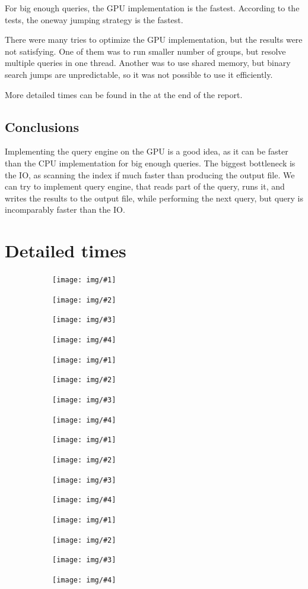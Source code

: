 \documentclass[a4paper,12pt]{article}
\newcommand{\plottimes}[4]{
    \begin{figure}
        \begin{subfigure}{.5\textwidth}
            \centering
            \texttt{[image: img/\#1]}
        \end{subfigure}%
        \begin{subfigure}{.5\textwidth}
            \centering
            \texttt{[image: img/\#2]}
        \end{subfigure}
        \begin{subfigure}{.5\textwidth}
            \centering
            \texttt{[image: img/\#3]}
        \end{subfigure}%
        \begin{subfigure}{.5\textwidth}
            \centering
            \texttt{[image: img/\#4]}
        \end{subfigure}
    \end{figure}
}
\begin{document}
    For big enough queries, the GPU implementation is the fastest.
    According to the tests, the oneway jumping strategy is the fastest.

    There were many tries to optimize the GPU implementation, but the results were not satisfying.
    One of them was to run smaller number of groups, but resolve multiple queries in one thread.
    Another was to use shared memory, but binary search jumps are unpredictable, so it was not possible to use it efficiently.

    More detailed times can be found in the at the end of the report.

    \subsection{Conclusions}

    Implementing the query engine on the GPU is a good idea, as it can be faster than the CPU implementation for big enough queries.
    The biggest bottleneck is the IO, as scanning the index if much faster than producing the output file.
    We can try to implement query engine, that reads part of the query, runs it, and writes the results to the output file, while
    performing the next query, but query is incomparably faster than the IO.


    \section{Detailed times}

    \plottimes{time_bar_N10000_total_time}{time_bar_N10000_query_time}{time_boxplot_N10000_total_time}{time_boxplot_N10000_query_time}
    \plottimes{time_bar_N100000_total_time}{time_bar_N100000_query_time}{time_boxplot_N100000_total_time}{time_boxplot_N100000_query_time}
    \plottimes{time_bar_N1000000_total_time}{time_bar_N1000000_query_time}{time_boxplot_N1000000_total_time}{time_boxplot_N1000000_query_time}
    \plottimes{time_bar_N10000000_total_time}{time_bar_N10000000_query_time}{time_boxplot_N10000000_total_time}{time_boxplot_N10000000_query_time}
\end{document}
